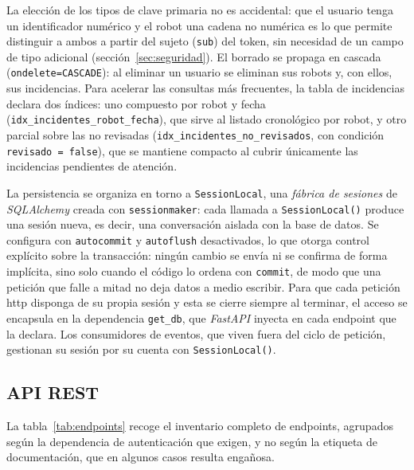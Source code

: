 La elección de los tipos de clave primaria no es accidental: que el usuario tenga un
identificador numérico y el robot una cadena no numérica es lo que permite distinguir
a ambos a partir del sujeto (\texttt{sub}) del token, sin necesidad de un campo de
tipo adicional (sección~\ref{sec:seguridad}). El borrado se propaga en cascada
(\texttt{ondelete=CASCADE}): al eliminar un usuario se eliminan sus robots y, con
ellos, sus incidencias. Para acelerar las consultas más frecuentes, la tabla de
incidencias declara dos índices: uno compuesto por robot y fecha
(\texttt{idx\_incidentes\_robot\_fecha}), que sirve al listado cronológico por robot,
y otro parcial sobre las no revisadas (\texttt{idx\_incidentes\_no\_revisados}, con
condición \texttt{revisado = false}), que se mantiene compacto al cubrir únicamente
las incidencias pendientes de atención.

La persistencia se organiza en torno a \texttt{SessionLocal}, una \textit{fábrica de
sesiones} de \textit{SQLAlchemy} creada con \texttt{sessionmaker}: cada llamada a
\texttt{SessionLocal()} produce una sesión nueva, es decir, una conversación aislada
con la base de datos. Se configura con \texttt{autocommit} y \texttt{autoflush}
desactivados, lo que otorga control explícito sobre la transacción: ningún cambio se
envía ni se confirma de forma implícita, sino solo cuando el código lo ordena con
\texttt{commit}, de modo que una petición que falle a mitad no deja datos a medio
escribir. Para que cada petición \gls{http} disponga de su propia sesión y esta se cierre
siempre al terminar, el acceso se encapsula en la dependencia \texttt{get\_db}, que
\textit{FastAPI} inyecta en cada endpoint que la declara. Los consumidores de eventos,
que viven fuera del ciclo de petición, gestionan su sesión por su cuenta con
\texttt{SessionLocal()}.

\subsection{API REST}
\label{sec:api-rest}

La tabla~\ref{tab:endpoints} recoge el inventario completo de endpoints, agrupados
según la dependencia de autenticación que exigen, y no según la etiqueta de
documentación, que en algunos casos resulta engañosa.

